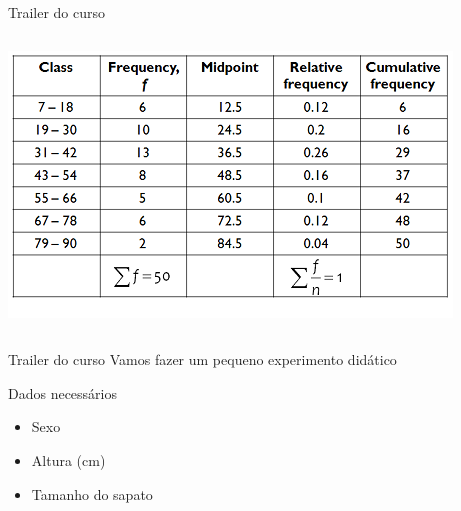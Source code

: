 \documentclass{beamer}
\begin{document}
\begin{frame}{Trailer do curso}
\begin{columns}
\begin{column}{6cm}
\begin{center}
      \includegraphics[width=.9\textwidth]{Intro/table}
      \end{center}
    \end{column}
  \end{columns}
\end{frame}

\begin{frame}{Trailer do curso}
Vamos fazer um pequeno experimento didático

  \begin{block}{Dados necessários}
    \begin{itemize}
    \item Sexo
    \item Altura (cm)
    \item Tamanho do sapato
    \end{itemize}
  \end{block}
\end{frame}
\end{document}
